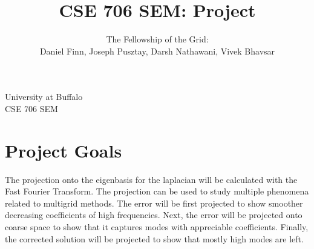 \documentclass{article}
\begin{document}
\begin{titlepage}

\title{CSE 706 SEM: Project}
\author{The Fellowship of the Grid: \\
Daniel Finn, Joseph Pusztay, Darsh Nathawani, Vivek Bhavsar}
\date{}
\maketitle
	\begin{center}
		University at Buffalo\\
		CSE 706 SEM\\
	\end{center}
\end{titlepage}

\section{Project Goals}

The projection onto the eigenbasis for the laplacian will be calculated with the Fast Fourier Transform.   The projection can be used to study multiple phenomena related to multigrid methods.  The error will be first projected to show smoother decreasing coefficients of high frequencies.  Next, the error will be projected onto coarse space to show that it captures modes with appreciable coefficients.  Finally, the corrected solution will be projected to show that mostly high modes are left.
\end{document}
